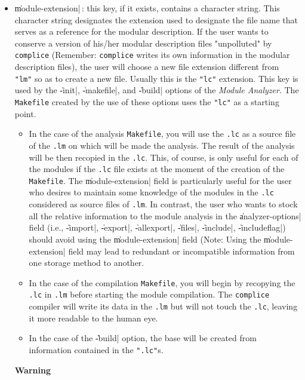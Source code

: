 \begin{itemize}
\item {\Large \|module-extension|}\,: this key, if it exists, contains a character string.
This character string designates the extension used to designate the file name that serves as a reference for the modular description.  If the user wants to conserve a version of his/her modular description files "unpolluted" by {\tt complice} (Remember:  {\tt complice} writes its own information in the modular description files), the user will choose a new file extension different from {\tt
"lm"} so as to create a new file.  
Usually this is the {\tt "lc"} extension.  This key is used by the \|-init|, \|-makefile|, and \|-build| options of the {\em Module Analyzer}.
The {\tt Makefile} created by the use of these  options uses the {\tt "lc"} as a starting point.
\begin{itemize}
\item In the case of the analysis {\tt Makefile}, you will use the {\tt .lc} as a source file of the {\tt .lm} on which will be made the analysis.
The result of the analysis will be then recopied in the {\tt .lc}.  This, of course, is only useful for each of the modules if the {\tt .lc} file exists at the moment of the creation of the {\tt Makefile}.  The \|module-extension| field is particularly useful for the user who desires to maintain some knowledge of the modules in the {\tt .lc} considered as source files of {\tt .lm}.
In contrast, the user who wants to stock all the relative information to the module analysis in the \|analyzer-options| field (i.e., \|-import|, \|-export|, \|-allexport|, \|-files|, \|-include|, \|-includeflag|)
should avoid using the \|module-extension| field (Note:  Using the \|module-extension| field may lead to redundant or incompatible information from one storage method to another.

\item In the case of the compilation {\tt Makefile}, you will begin by recopying the {\tt .lc} in {\tt .lm} before starting the module compilation.  The {\tt complice} compiler will write its data in the {\tt .lm} but will not touch the {\tt .lc}, leaving it more readable to the human eye.

\item In the case of the \|-build| option, the base will be created from information contained in the {\tt ".lc"}s. 

\end{itemize}

\begin{Side}{\bf Warning} 


\end{Side}
\end{itemize}
